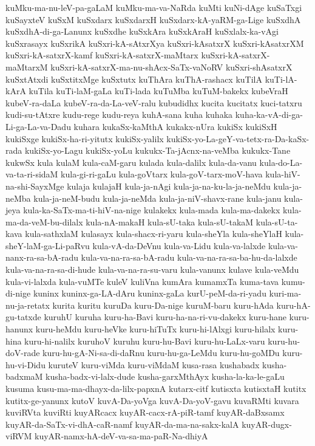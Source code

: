 {kuMku-ma-nu-leV-pa-gaLaM
kuMku-ma-va-NaRda
kuMti
kuNi-dAge
kuSaTxgi
kuSayxteV
kuSxM
kuSxdarx
kuSxdarxH
kuSxdarx-kA-yaRM-ga-Lige
kuSxdhA
kuSxdhA-di-ga-Lanunx
kuSxdhe
kuSxkAra
kuSxkAraH
kuSxlalx-ka-vAgi
kuSxrasayx
kuSxrikA
kuSxri-kA-sAtxrXya
kuSxri-kAsatxrX
kuSxri-kAsatxrXM
kuSxri-kA-satxrX-kamf
kuSxri-kA-satxrX-maMtarx
kuSxri-kA-satxrX-maMtarxM
kuSxri-kA-satxrX-ma-nu-shAcx-SaTx-vaNoRV
kuSxri-shAsatxrX
kuSxtAtxdi
kuSxtitxMge
kuSxtutx
kuThAra
kuThA-rashacx
kuTilA
kuTi-lA-kArA
kuTila
kuTi-laM-gaLa
kuTi-lada
kuTuMba
kuTuM-bakekx
kubeVraH
kubeV-ra-daLa
kubeV-ra-da-La-veV-ralu
kubudidhx
kucita
kucitatx
kuci-tatxru
kudi-su-tAtxre
kudu-rege
kudu-reya
kuhA-sana
kuha
kuhaka
kuha-ka-vA-di-ga-Li-ga-La-va-Dadu
kuhara
kukaSx-kaMthA
kukakx-nUra
kukiSx
kukiSxH
kukiSxge
kukiSx-ha-ri-yitutx
kukiSx-yalilx
kukiSx-yo-La-geY-va-tetx-ra-Da-kaSx-rada
kukiSx-yo-Lagu
kukiSx-yoLu
kukukx-Ta-jAcnx-na-veMba
kukukx-Tane
kukwSx
kula
kulaM
kula-caM-garu
kulada
kula-dalilx
kula-da-vanu
kula-do-La-va-ta-ri-sidaM
kula-gi-ri-gaLu
kula-goVtarx
kula-goV-tarx-moV-hava
kula-hiV-na-shi-SayxMge
kulaja
kulajaH
kula-ja-nAgi
kula-ja-na-ku-la-ja-neMdu
kula-ja-neMba
kula-ja-neM-budu
kula-ja-neMda
kula-ja-niV-shavx-rane
kula-janu
kula-jeya
kula-ka-SaTx-ma-ti-hiV-na-nige
kulakekx
kula-mada
kula-ma-dakekx
kula-ma-da-veM-bu-dilalx
kula-nA-makaH
kula-sU-taka
kula-sU-takaM
kula-sU-ta-kava
kula-sathxlaM
kulasayx
kula-shacx-ri-yaru
kula-sheYla
kula-sheYlaH
kula-sheY-laM-ga-Li-paRvu
kula-vA-da-DeVnu
kula-va-Lidu
kula-va-lalxde
kula-va-nanx-ra-sa-bA-radu
kula-va-na-ra-sa-bA-radu
kula-va-na-ra-sa-ba-hu-da-lalxde
kula-va-na-ra-sa-di-hude
kula-va-na-ra-su-varu
kula-vanunx
kulave
kula-veMdu
kula-vi-lalxda
kula-vuMTe
kuleV
kuliVna
kumAra
kumamxTa
kuma-tava
kumu-di-nige
kuninx
kuninx-ga-LA-dAru
kuninx-gaLa
kurU-peM-da-ri-yadu
kuri-ma-nu-ja-retatx
kurita
kuritu
kuruDa
kuru-Da-nige
kuruM-baru
kuru-hAda
kuru-hA-gu-tatxde
kuruhU
kuruha
kuru-ha-Bavi
kuru-ha-na-ri-vu-dakekx
kuru-hane
kuru-hanunx
kuru-heMdu
kuru-heVke
kuru-hiTuTx
kuru-hi-lAlxgi
kuru-hilalx
kuru-hina
kuru-hi-nalilx
kuruhoV
kuruhu
kuru-hu-Bavi
kuru-hu-LaLx-varu
kuru-hu-doV-rade
kuru-hu-gA-Ni-sa-di-daRnu
kuru-hu-ga-LeMdu
kuru-hu-goMDu
kuru-hu-vi-Didu
kuruteV
kuru-viMda
kuru-viMdaM
kusa-rasa
kushabadx
kusha-badxmaM
kusha-badx-vi-lalx-dude
kusha-garxMthAyx
kusha-la-ka-le-gaLu
kusuma
kusu-ma-ma-dhayx-da-lilx-papxnA
kutarx-citf
kutisxta
kutisxtaH
kutitx
kutitx-ge-yanunx
kutoV
kuvA-Da-yoVga
kuvA-Da-yoV-gavu
kuvaRMti
kuvara
kuviRVta
kuviRti
kuyARcacx
kuyAR-cacx-rA-piR-tamf
kuyAR-daBxsamx
kuyAR-da-SaTx-vi-dhA-caR-namf
kuyAR-da-ma-na-sakx-kalA
kuyAR-dugx-viRVM
kuyAR-namx-hA-deV-va-sa-ma-paR-Na-dhiyA
}
